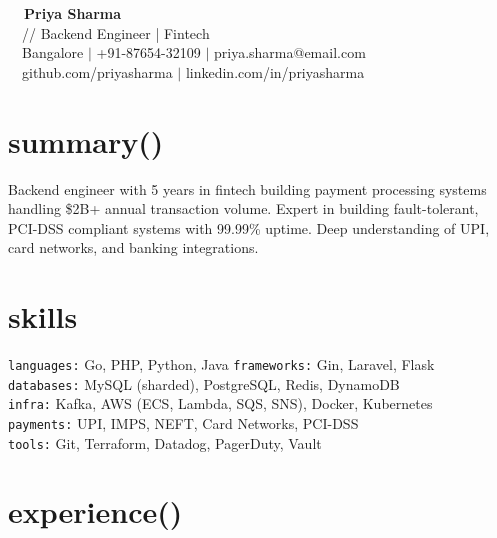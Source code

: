 \documentclass[10pt,a4paper]{article}
\begin{document}
\noindent\colorbox{codebg}{\parbox{\dimexpr\textwidth-8pt}{%
\vspace{6pt}
{\color{accent}\ttfamily\large\bfseries \ \ Priya Sharma}\\[2pt]
{\color{white}\ttfamily\footnotesize \ \ // Backend Engineer | Fintech}\\[2pt]
{\color{gray}\ttfamily\footnotesize \ \ Bangalore $|$ +91-87654-32109 $|$ priya.sharma@email.com}\\[1pt]
{\color{gray}\ttfamily\footnotesize \ \ github.com/priyasharma $|$ linkedin.com/in/priyasharma}
\vspace{6pt}
}}

\vspace{6pt}

\section{summary()}

{\small Backend engineer with 5 years in fintech building payment processing systems handling \$2B+ annual transaction volume. Expert in building fault-tolerant, PCI-DSS compliant systems with 99.99\% uptime. Deep understanding of UPI, card networks, and banking integrations.}

\section{skills}

{\small
\texttt{languages:} Go, PHP, Python, Java \quad
\texttt{frameworks:} Gin, Laravel, Flask\\
\texttt{databases:} MySQL (sharded), PostgreSQL, Redis, DynamoDB\\
\texttt{infra:} Kafka, AWS (ECS, Lambda, SQS, SNS), Docker, Kubernetes\\
\texttt{payments:} UPI, IMPS, NEFT, Card Networks, PCI-DSS\\
\texttt{tools:} Git, Terraform, Datadog, PagerDuty, Vault
}

\section{experience()}
\end{document}
